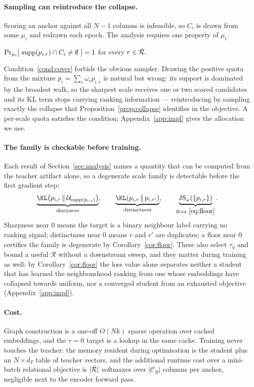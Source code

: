 \paragraph{Sampling can reintroduce the collapse.}
Scoring an anchor against all $N-1$ columns is infeasible, so $C_i$ is drawn from some
$\mu_i$ and redrawn each epoch. The analysis requires one property of $\mu_i$.

\begin{condition}
\label{cond:cover}
$\Pr_{\mu_i}\!\left[\ \mathrm{supp}(p_{i,r}) \cap C_i \neq \emptyset\ \right] = 1$ for every
$r\in\bar{\mathcal{R}}$.
\end{condition}

Condition~\ref{cond:cover} forbids the obvious sampler. Drawing the positive quota from the
mixture $\bar p_i = \sum_r \omega_r p_{i,r}$ is natural but wrong: its support is dominated
by the broadest walk, so the sharpest scale receives one or two scored candidates and its KL
term stops carrying ranking information --- reintroducing by sampling exactly the collapse
that Proposition~\ref{prop:collapse} identifies in the objective. A per-scale quota
satisfies the condition; Appendix~\ref{app:impl} gives the allocation we use.

\paragraph{The family is checkable before training.}
Each result of Section~\ref{sec:analysis} names a quantity that can be computed from the
teacher artifact alone, so a degenerate scale family is detectable before the first gradient
step:
\begin{equation}
    \underbrace{\KL\!\left(p_{i,r}\,\Vert\,\mathcal{U}_{\supp(p_{i,r})}\right)}_{\text{sharpness}},
    \qquad
    \underbrace{\KL\!\left(p_{i,r}\,\Vert\,p_{i,r'}\right)}_{\text{distinctness}},
    \qquad
    \underbrace{\JS_\omega\!\left(\{p_{i,r}\}\right)}_{\text{floor }\eqref{eq:floor}} .
    \label{eq:diag1}
\end{equation}
Sharpness near $0$ means the target is a binary neighbour label carrying no ranking signal;
distinctness near $0$ means $r$ and $r'$ are duplicates; a floor near $0$ certifies the
family is degenerate by Corollary~\ref{cor:floor}. These also select $\tau_g$ and bound a
useful $\mathcal{R}$ without a downstream sweep, and they matter during training as well:
by Corollary~\ref{cor:floor} the loss value alone separates neither a student that has
learned the neighbourhood ranking from one whose embeddings have collapsed towards uniform,
nor a converged student from an exhausted objective (Appendix~\ref{app:impl}).

\paragraph{Cost.}
Graph construction is a one-off $O(Nk)$ sparse operation over cached embeddings, and the
$r=0$ target is a lookup in the same cache. Training never touches the teacher: the memory
resident during optimisation is the student plus an $N\times d_T$ table of teacher vectors,
and the additional runtime cost over a mini-batch relational objective is $|\bar{\mathcal{R}}|$ softmaxes
over $|\mathcal{C}_B|$ columns per anchor, negligible next to the encoder forward pass.
